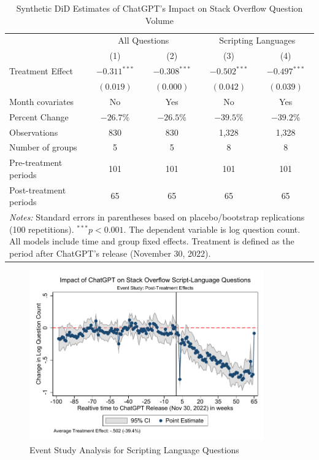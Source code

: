 \begin{table}[htpb!]
    \centering
    \caption{Synthetic DiD Estimates of ChatGPT's Impact on Stack Overflow Question Volume}
    \label{tab:app-sdid_results}
    \begin{tabular}{lcccc}
        \toprule
            & \multicolumn{2}{c}{All Questions} & \multicolumn{2}{c}{Scripting Languages} \\
            \cmidrule(lr){2-3} \cmidrule(lr){4-5}
            & (1) & (2) & (3) & (4) \\
        \midrule
            Treatment Effect & $-0.311^{***}$ & $-0.308^{***}$ & $-0.502^{***}$ & $-0.497^{***}$ \\
            & $(0.019)$ & $(0.000)$ & $(0.042)$ & $(0.039)$ \\
        \midrule
            Month covariates & No & Yes & No & Yes \\
            Percent Change & $-26.7\%$ & $-26.5\%$ & $-39.5\%$ & $-39.2\%$ \\
        \midrule
            Observations & 830 & 830 & 1,328 & 1,328 \\
            Number of groups & 5 & 5 & 8 & 8 \\
            Pre-treatment periods & 101 & 101 & 101 & 101 \\
            Post-treatment periods & 65 & 65 & 65 & 65 \\
        \bottomrule
            \multicolumn{5}{p{0.95\linewidth}}{\footnotesize \textit{Notes:} Standard errors in parentheses based on placebo/bootstrap replications (100 repetitions). $^{***}p<0.001$. The dependent variable is log question count. All models include time and group fixed effects. Treatment is defined as the period after ChatGPT's release (November 30, 2022).} \\
    \end{tabular}
\end{table}


\begin{figure}[H]
    \centering
    \includegraphics[width=0.9\textwidth]{imgs/stata/event_study_scripting_languages.pdf}
    \caption{Event Study Analysis for Scripting Language Questions}
    \label{fig:app-event_study}
\end{figure}

